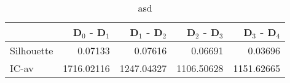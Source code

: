 \begin{table}
\centering
\caption{asd}
\label{tab:delmh-orig-eca-combined}
\begin{tabular}{lrrrr}
\toprule
{} &  D$_0$ - D$_1$ &  D$_1$ - D$_2$ &  D$_2$ - D$_3$ &  D$_3$ - D$_4$ \\
\midrule
Silhouette &        0.07133 &        0.07616 &        0.06691 &        0.03696 \\
IC-av      &     1716.02116 &     1247.04327 &     1106.50628 &     1151.62665 \\
\bottomrule
\end{tabular}
\end{table}
